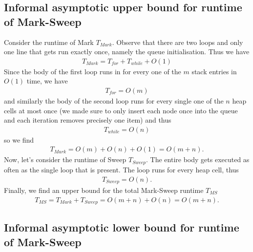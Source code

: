 \documentclass{article}
\begin{document}
\subsection{Informal asymptotic upper bound for runtime of Mark-Sweep}

Consider the runtime of Mark $T_{Mark}$. Observe that there are two loops
and only one line that gets run exactly once, namely the queue initialisation.
Thus we have
\begin{align*}
    T_{Mark} = T_{for} + T_{while} + O(1)
\end{align*}
Since the body of the first loop runs in for every one of the $m$ stack entries
in $O(1)$ time, we have
\begin{align*}
    T_{for} = O(m)
\end{align*}
and similarly the body of the second loop runs for every single one of 
the $n$ heap cells at most once
(we made sure to only insert each node once into the queue and each iteration
removes precisely one item) and thus
\begin{align*}
    T_{while} = O(n)
\end{align*}
so we find 
\begin{align*}
    T_{Mark} = O(m) + O(n) + O(1) = O(m + n).
\end{align*}
Now, let's consider the runtime of Sweep $T_{Sweep}$. The entire body gets
executed as often as the single loop that is present. The loop runs for every
heap cell, thus 
\begin{align*}
    T_{Sweep} = O(n).
\end{align*}
Finally, we find an upper bound for the total Mark-Sweep runtime $T_{MS}$
\begin{align}
    \label{infhims}
    T_{MS} = T_{Mark} + T_{Sweep} = O(m+n) + O(n) = O(m + n).
\end{align}

\subsection{Informal asymptotic lower bound for runtime of Mark-Sweep}
\end{document}
